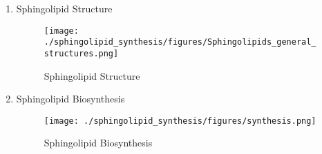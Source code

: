 \documentclass{scrartcl}
\begin{document}
\begin{enumerate}
\item Sphingolipid Structure
\label{sec:orgc5db135}

\begin{figure}[htbp]
\centering
\texttt{[image: ./sphingolipid\_synthesis/figures/Sphingolipids\_general\_structures.png]}
\caption[Sphingolipid Structure]{\label{fig:orgba703de}
Sphingolipid Structure}
\end{figure}

\item Sphingolipid Biosynthesis
\label{sec:org2af3f8a}

\begin{figure}[htbp]
\centering
\texttt{[image: ./sphingolipid\_synthesis/figures/synthesis.png]}
\caption[Sphingolipid Biosynthesis]{\label{fig:orgcb42f9d}
Sphingolipid Biosynthesis}
\end{figure}
\end{enumerate}
\end{document}
